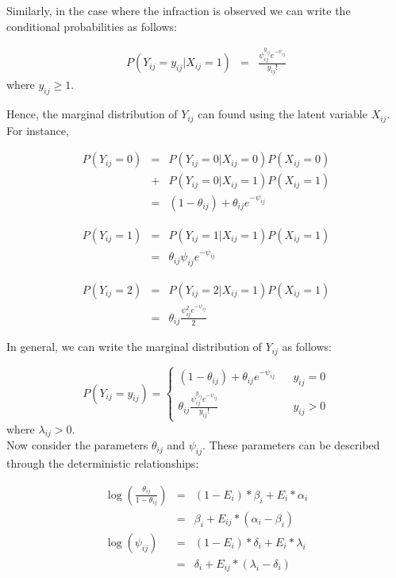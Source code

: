 \documentclass[twoside,onecolumn]{article}
\begin{document}
Similarly, in the case where the infraction is observed we can write the conditional probabilities as follows:

$$
\begin{array}{rcl}
P(Y_{ij} = y_{ij} | X_{ij} = 1) &=& \frac{\psi_{ij}^{y_{ij}} e^{-\psi_{ij}}}{y_{ij}!}
\end{array}
$$
where $y_{ij} \ge 1$.

Hence, the marginal distribution of $Y_{ij}$ can found using the latent variable $X_{ij}$. For instance,

$$
\begin{array}{rcl}
P(Y_{ij} = 0) &=& P(Y_{ij} = 0 | X_{ij} = 0)P(X_{ij} = 0) \\ &+& P(Y_{ij} = 0 | X_{ij} = 1)P(X_{ij} = 1) \\
&=& (1-\theta_{ij}) + \theta_{ij} e^{-\psi_{ij}}
\end{array}
$$

$$
\begin{array}{rcl}
P(Y_{ij} = 1) &=& P(Y_{ij} = 1 | X_{ij} = 1)P(X_{ij} = 1) \\
&=& \theta_{ij} \psi_{ij} e^{-\psi_{ij}}
\end{array}
$$

$$
\begin{array}{rcl}
P(Y_{ij} = 2) &=& P(Y_{ij} = 2 | X_{ij} = 1)P(X_{ij} = 1) \\
&=& \theta_{ij} \frac{\psi_{ij}^2 e^{-\psi_{ij}}}{2}
\end{array}
$$

In general, we can write the marginal distribution of $Y_{ij}$ as follows:

$$
P(Y_{ij} = y_{ij}) = 
\left\{  \begin{array}{lcl}
           (1-\theta_{ij}) + \theta_{ij} e^{-\psi_{ij}}  & & y_{ij}=0\\
           \theta_{ij} \frac{\psi_{ij}^{y_{ij}} e^{-\psi_{ij}}}{y_{ij}!} & & y_{ij} > 0
          \end{array}
\right.
$$
where $\lambda_{ij} > 0$. \\

Now consider the parameters $\theta_{ij}$ and $\psi_{ij}$. These parameters can be described through the deterministic relationships:

$$
\begin{array}{rcl}
\log(\frac{\theta_{ij}}{1-\theta_{ij}}) &=& (1 - E_{i})*\beta_i + E_{i}*\alpha_i \\
&=& \beta_i + E_{ij}*(\alpha_i - \beta_i) \\
\log(\psi_{ij}) &=& (1 - E_{i})*\delta_i + E_{i}*\lambda_i \\
&=& \delta_i + E_{ij}*(\lambda_i - \delta_i)\\
\end{array}
$$
\end{document}
